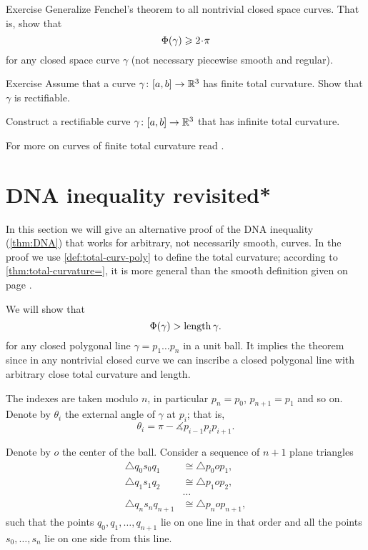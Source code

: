 \begin{thm}{Exercise}\label{ex:gen-fenchel}
Generalize Fenchel's theorem to all nontrivial closed space curves.
That is, show that \[\tc\gamma\ge2\cdot\pi\]
for any  closed space curve $\gamma$ (not necessary piecewise smooth and regular).
\end{thm}

\begin{thm}{Exercise}\label{ex:tc-length}
Assume that a curve $\gamma\colon[a,b]\to\mathbb{R}^3$ has finite total curvature.
Show that $\gamma$ is rectifiable.

Construct a rectifiable curve $\gamma\colon[a,b]\to\mathbb{R}^3$ that has infinite total curvature.
\end{thm}

For more on curves of finite total curvature read \cite{aleksandrov-reshetnyak,sullivan-curves}. 

\section*{DNA inequality revisited*}

In this section we will give an alternative proof of the DNA inequality (\ref{thm:DNA}) that works for arbitrary, not necessarily smooth, curves.
In the proof we use \ref{def:total-curv-poly} to define the total curvature;
according to \ref{thm:total-curvature=}, it is more general than the smooth definition given on page \pageref{page:total curvature of:smooth-def}.

We will show that 
\[\Phi({\gamma})> \mathop{\rm length}\nolimits\gamma.\]
for any closed polygonal line $\gamma=p_1\dots p_{n}$ in a unit ball.
It implies the theorem since in any nontrivial closed curve we can inscribe a closed polygonal line with arbitrary close total curvature and length.

The indexes are taken modulo $n$, in particular $p_{n}=p_0$, $p_{n+1}=p_1$ and so on.
Denote by $\theta_i$ the external angle of $\gamma$ at $p_i$;
that is,
\[\theta_i=\pi-\measuredangle p_{i-1}p_ip_{i+1}.\]

Denote by $o$ the center of the ball.
Consider a sequence of $n+1$ plane triangles
\begin{align*}
\triangle q_0s_0q_1
&\cong 
\triangle p_0op_1,
\\
\triangle q_1s_1q_2
&\cong 
\triangle p_1op_2,
\\
&\dots
\\
\triangle q_{n}s_nq_{n+1}
&\cong 
\triangle p_nop_{n+1},
\end{align*}
such that the points $q_0,q_1,\dots,q_{n+1}$ lie on one line in that order and all the points $s_0,\dots,s_n$ lie on one side from this line.

